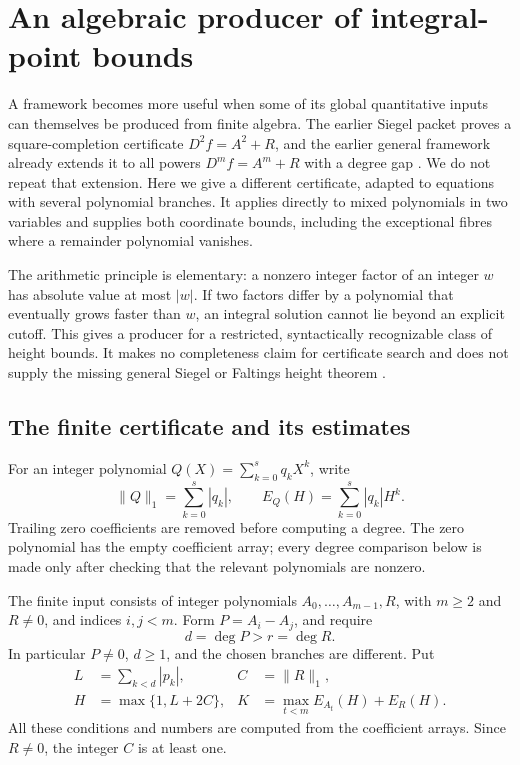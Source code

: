 \section{An algebraic producer of integral-point bounds}
\label{sec:split-branches}

A framework becomes more useful when some of its global quantitative
inputs can themselves be produced from finite algebra.  The earlier
Siegel packet proves a square-completion certificate
\(D^2 f=A^2+R\), and the earlier general framework already extends it
to all powers \(D^m f=A^m+R\) with a degree gap
\cite{rungepacket,oldframework}.  We do not repeat that extension.
Here we give a different certificate, adapted to equations with several
polynomial branches.  It applies directly to mixed polynomials in two
variables and supplies both coordinate bounds, including the exceptional
fibres where a remainder polynomial vanishes.

The arithmetic principle is elementary: a nonzero integer factor of an
integer \(w\) has absolute value at most \(|w|\).  If two factors differ
by a polynomial that eventually grows faster than \(w\), an integral
solution cannot lie beyond an explicit cutoff.  This gives a producer
for a restricted, syntactically recognizable class of height bounds.
It makes no completeness claim for certificate search and does not supply
the missing general Siegel or Faltings height theorem
\cite{rungepacket,faltingspacket}.

\subsection{The finite certificate and its estimates}

For an integer polynomial \(Q(X)=\sum_{k=0}^s q_kX^k\), write
\[
 \|Q\|_1=\sum_{k=0}^s|q_k|,
 \qquad
 E_Q(H)=\sum_{k=0}^s |q_k|H^k.
\]
Trailing zero coefficients are removed before computing a degree.
The zero polynomial has the empty coefficient array; every degree
comparison below is made only after checking that the relevant
polynomials are nonzero.

\begin{definition}
\label{def:split-cert}
The finite input consists of integer polynomials
\(A_0,\ldots,A_{m-1},R\), with \(m\geq2\) and \(R\ne0\), and indices
\(i,j<m\).  Form \(P=A_i-A_j\), and require
\[
 d=\deg P>r=\deg R.
\]
In particular \(P\ne0\), \(d\geq1\), and the chosen branches are
different.  Put
\begin{align}
 L&=\sum_{k<d}|p_k|,
 & C&=\|R\|_1,\label{eq:split-LC}\\
 H&=\max\{1,L+2C\},
 & K&=\max_{t<m}E_{A_t}(H)+E_R(H).
 \label{eq:split-HK}
\end{align}
All these conditions and numbers are computed from the coefficient
arrays.  Since \(R\ne0\), the integer \(C\) is at least one.
\end{definition}

